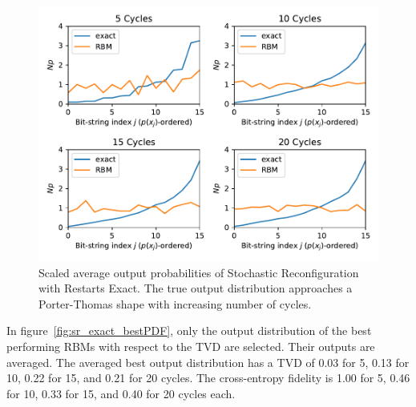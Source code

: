 \begin{figure}[H]
  \centering
  \includegraphics[width=\textwidth]{figures/results/SR-restarts-not-learned/avgPDF.pdf}
  \caption[Scaled average output probabilities of Stochastic Reconfiguration with Restarts Exact]{
    Scaled average output probabilities of Stochastic Reconfiguration with Restarts Exact. The true 
    output distribution approaches a Porter-Thomas shape with increasing number of cycles.}
  \label{fig:sr_exact_avgPDF}
\end{figure}

In figure~\ref{fig:sr_exact_bestPDF}, only the output distribution of the best performing RBMs with respect to the 
TVD are selected. Their outputs are averaged. The averaged best output distribution 
has a TVD of 0.03 for 5, 0.13 for 10, 0.22 for 15, and 0.21 for 20 
cycles. The cross-entropy fidelity is 1.00 for 5, 0.46 for 10, 0.33 for 15, and 0.40 for 20 cycles each. 


